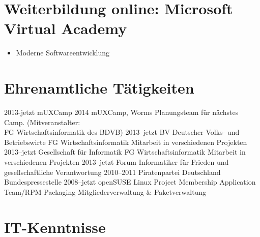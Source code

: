 \documentclass[a4paper,latin]{friggeri-cv} %
\begin{document}
\section{Weiterbildung online: Microsoft Virtual Academy}
\begin{itemize}
\item Moderne Softwareentwicklung
\end{itemize}

\newpage 
\section{Ehrenamtliche Tätigkeiten}
\begin{entrylist}
\entry
{2013-jetzt}
{mUXCamp 2014}
{mUXCamp, Worms}
{Planungsteam für nächstes Camp. (Mitveranstalter: \\FG Wirtschaftsinformatik des BDVB)}
\entry
{2013--jetzt}
{BV Deutscher Volks- und Betriebswirte}
{FG Wirtschaftsinformatik}
{Mitarbeit in verschiedenen Projekten}
\entry
{2013--jetzt}
{Gesellschaft für Informatik}
{FG Wirtschaftsinformatik}
{Mitarbeit in verschiedenen Projekten}
\entry
{2013--jetzt}
{Forum Informatiker für Frieden und gesellschaftliche Verantwortung}
{}
{}
\entry
{2010--2011}
{Piratenpartei Deutschland}
{Bundespressestelle}
{}
\entry
{2008--jetzt}
{openSUSE Linux Project}
{Membership Application Team/RPM Packaging}
{Mitgliederverwaltung \& Paketverwaltung}
\end{entrylist}


\section{IT-Kenntnisse}
\end{document}
